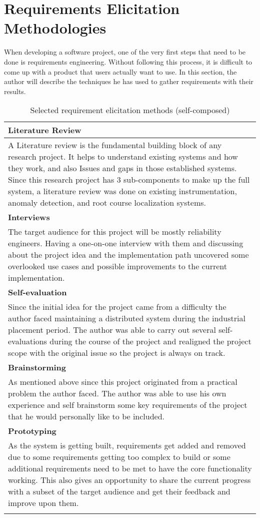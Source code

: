 \section{Requirements Elicitation Methodologies}

When developing a software project, one of the very first steps that need to be done is requirements engineering. Without following this process, it is difficult to come up with a product that users actually want to use. In this section, the author will describe the techniques he has used to gather requirements with their results.

\begin{longtable}{|p{160mm}|}
\hline
\textbf{Literature Review} \\ \hline
A Literature review is the fundamental building block of any research project. It helps to understand existing systems and how they work, and also Issues and gaps in those established systems. Since this research project has 3 sub-components to make up the full system, a literature review was done on existing instrumentation, anomaly detection, and root course localization systems. \\ \hline

\textbf{Interviews} \\ \hline
The target audience for this project will be mostly reliability engineers. Having a one-on-one interview with them and discussing about the project idea and the implementation path uncovered some overlooked use cases and possible improvements to the current implementation. \\ \hline


\textbf{Self-evaluation} \\ \hline
Since the initial idea for the project came from a difficulty the author faced maintaining a distributed system during the industrial placement period. The author was able to carry out several self-evaluations during the course of the project and realigned the project scope with the original issue so the project is always on track. \\ \hline

\textbf{Brainstorming} \\ \hline
As mentioned above since this project originated from a practical problem the author faced. The author was able to use his own experience and self brainstorm some key requirements of the project that he would personally like to be included. \\ \hline

\textbf{Prototyping} \\ \hline
As the system is getting built, requirements get added and removed due to some requirements getting too complex to build or some additional requirements need to be met to have the core functionality working. This also gives an opportunity to share the current progress with a subset of the target audience and get their feedback and improve upon them. \\ \hline

\caption{Selected requirement elicitation methods (self-composed)}
\end{longtable}
